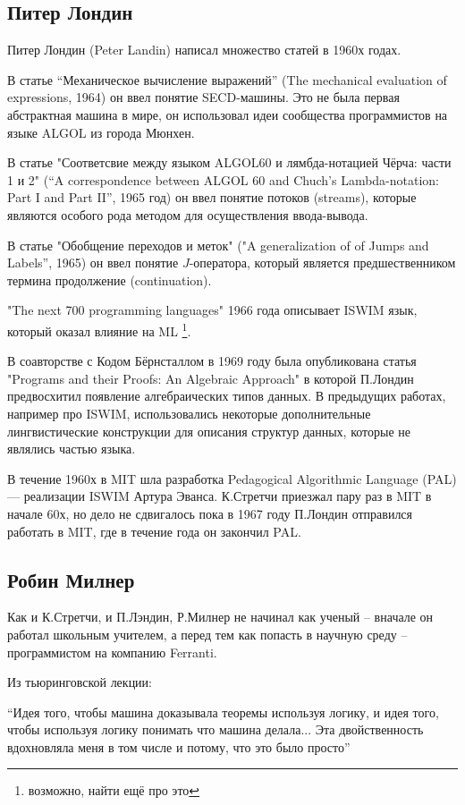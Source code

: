 \documentclass[14pt]{matmex-diploma-custom}
\begin{document}
\subsection{Питер Лондин}
Питер Лондин (Peter Landin) %
написал множество статей в 1960х годах.

В статье “Механическое вычисление выражений” (The mechanical evaluation of expressions, 1964) он ввел понятие SECD-машины. Это не была  первая абстрактная машина в мире, он использовал идеи сообщества программистов на языке ALGOL из города Мюнхен. 

В статье "Соответсвие между языком ALGOL60 и лямбда-нотацией Чёрча: части 1 и 2" (“A correspondence between ALGOL 60 and Chuch’s Lambda-notation: Part I and Part II”, 1965 год) он ввел понятие потоков (streams), которые являются особого рода методом для осуществления ввода-вывода.

В статье "Обобщение переходов и меток" ("A generalization of of Jumps and Labels”, 1965) он ввел понятие $J$-оператора, который является предшественником термина продолжение (continuation).

"The next 700 programming languages" 1966 года описывает ISWIM язык, который оказал влияние на ML \footnote{возможно, найти ещё про это}.

В соавторстве с Кодом Бёрнсталлом в 1969 году была опубликована статья "Programs and their Proofs: An Algebraic Approach" в которой П.Лондин предвосхитил появление алгебраических типов данных. В предыдущих работах, например про ISWIM, использовались некоторые дополнительные лингвистические конструкции для описания структур данных, которые не являлись частью языка.

В течение 1960х в MIT шла разработка Pedagogical Algorithmic Language (PAL) --- реализации ISWIM Артура Эванса. К.Стретчи приезжал пару раз в MIT в начале 60х, но дело не сдвигалось пока в 1967 году П.Лондин отправился работать в MIT, где в течение года он закончил PAL.

\subsection{Робин Милнер}

Как и К.Стретчи, и П.Лэндин, Р.Милнер не начинал как ученый --  вначале он работал школьным учителем, а перед тем как попасть в научную среду -- программистом на компанию Ferranti.
\begin{framed}
Из тьюринговской лекции:

“Идея того, чтобы машина доказывала теоремы используя логику, и идея того, чтобы используя логику понимать что машина делала... Эта двойственность вдохновляла меня в том числе и потому, что это было просто”
\end{framed}
\end{document}
